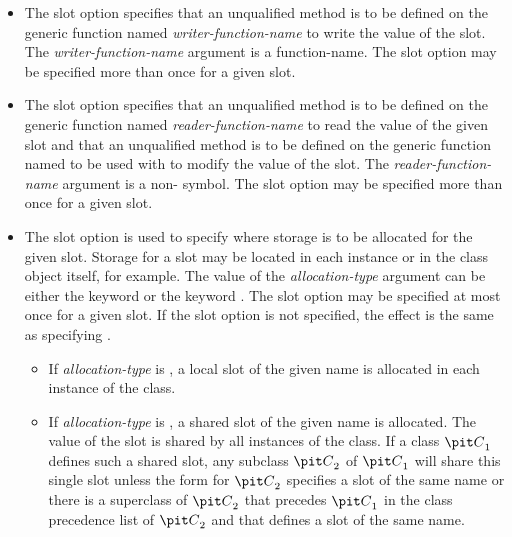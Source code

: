 \begin{defmac}
\begin{itemize}
\item  
The  slot option specifies that an unqualified method is
to be defined on the generic function named {\it
writer-function-name\/} to write the value of the slot.  The
{\it writer-function-name\/} argument is a function-name.
The  slot option may be specified more than once for a
given slot.

\item  
The  slot option specifies that an unqualified method
is to be defined on the generic function named {\it
reader-function-name\/} to read the value of the given slot
and that an unqualified method is to be defined on the generic
function named  to be
used with  to modify the value of the slot.  The {\it
reader-function-name\/} argument is a non- symbol.
The  slot option may be specified more than once for a
given slot.

\item  
The  slot option is used to specify where storage is
to be allocated for the given slot.  Storage for a slot may be located
in each instance or in the class object itself, for example.  The value of the {\it
allocation-type\/} argument can be either the keyword 
or the keyword .  The  slot option may be
specified at most once for a given slot.  If the 
slot option is not specified, the effect is the same as specifying
.

\begin{itemize}
\item
If {\it allocation-type\/} is , a local slot of the given name
is allocated in each instance of the class.  

\item
If {\it allocation-type\/} is , a shared slot of the given
name is allocated.  The value of the slot is shared by all instances of the class.
If a class ${\it C}\sub1$ defines such a shared slot, any subclass ${\it C}\sub2$ of
${\it C}\sub1$ will share this single slot unless the  form
for ${\it C}\sub2$ specifies a slot of the same name or there is a
superclass of ${\it C}\sub2$ that precedes ${\it C}\sub1$ in the class precedence
list of ${\it C}\sub2$ and that defines a slot of the same name.
\end{itemize}


\end{itemize}
\end{defmac}
